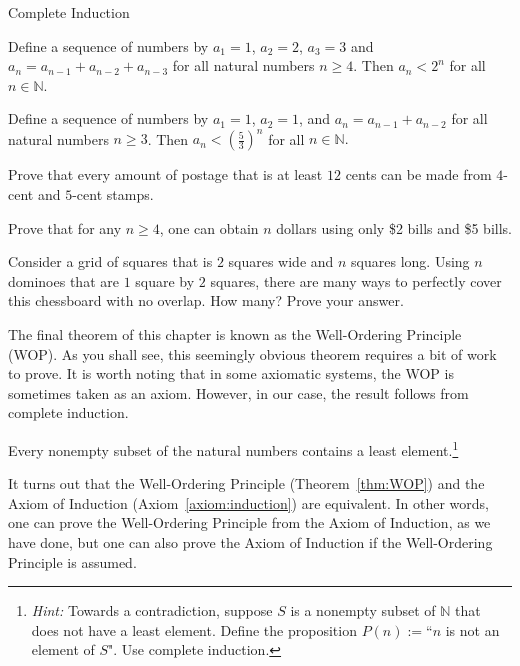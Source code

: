 \begin{section}{Complete Induction}
\begin{theorem}
Define a sequence of numbers by $a_1=1$, $a_2=2$, $a_3=3$ and $a_n=a_{n-1}+a_{n-2}+a_{n-3}$ for all natural numbers $n\geq 4$.  Then $a_n<2^n$ for all $n\in\mathbb N$.
\end{theorem}

\begin{theorem}
Define a sequence of numbers by $a_1=1$, $a_2=1$, and $a_n=a_{n-1}+a_{n-2}$ for all natural numbers $n \geq 3$.  Then $a_n < \left ( \frac{5}{3} \right )^n$ for all $n \in \mathbb{N}.$
\end{theorem}

\begin{problem}
Prove that every amount of postage that is at least $12$ cents can be made from $4$-cent and $5$-cent stamps.
\end{problem}

\begin{problem}
Prove that for any $n \geq 4$, one can obtain $n$ dollars using only \$2 bills and \$5 bills.
\end{problem}

\begin{problem}
Consider a grid of squares that is $2$ squares wide and $n$ squares long.  Using $n$ dominoes that are $1$ square by $2$ squares, there are many ways to perfectly cover this chessboard with no overlap.  How many?  Prove your answer.
\end{problem}

The final theorem of this chapter is known as the Well-Ordering Principle (WOP). As you shall see, this seemingly obvious theorem requires a bit of work to prove. It is worth noting that in some axiomatic systems, the WOP is sometimes taken as an axiom.  However, in our case, the result follows from complete induction.

\begin{theorem}\label{thm:WOP}
Every nonempty subset of the natural numbers contains a least element.\footnote{\emph{Hint:} Towards a contradiction, suppose $S$ is a nonempty subset of $\mathbb{N}$ that does not have a least element.  Define the proposition $P(n):=$``$n$ is not an element of $S$". Use complete induction.}
\end{theorem}

It turns out that the Well-Ordering Principle (Theorem~\ref{thm:WOP}) and the Axiom of Induction (Axiom~\ref{axiom:induction}) are equivalent.  In other words, one can prove the Well-Ordering Principle from the Axiom of Induction, as we have done, but one can also prove the Axiom of Induction if the Well-Ordering Principle is assumed.

\end{section}